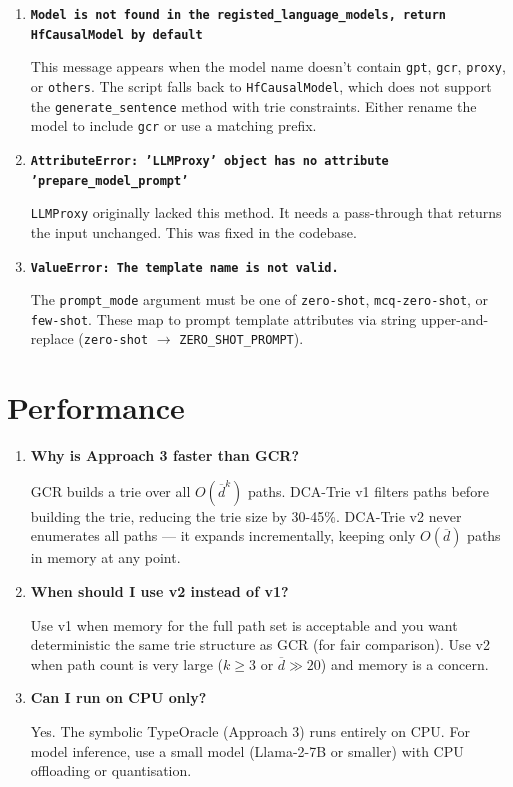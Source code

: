 \documentclass[11pt,a4paper,oneside,openany]{book}
\theoremstyle{definition}
\newcommand{\code}[1]{\texttt{#1}}
\begin{document}
\begin{enumerate}

	\item \textbf{\texttt{Model is not found in the registed\_language\_models, return HfCausalModel by default}}

	      This message appears when the model name doesn't contain \code{gpt}, \code{gcr}, \code{proxy}, or \code{others}. The script falls back to \code{HfCausalModel}, which does not support the \code{generate\_sentence} method with trie constraints. Either rename the model to include \code{gcr} or use a matching prefix.

	\item \textbf{\texttt{AttributeError: 'LLMProxy' object has no attribute 'prepare\_model\_prompt'}}

	      \code{LLMProxy} originally lacked this method. It needs a pass-through that returns the input unchanged. This was fixed in the codebase.

	\item \textbf{\texttt{ValueError: The template name is not valid.}}

	      The \code{prompt\_mode} argument must be one of \code{zero-shot}, \code{mcq-zero-shot}, or \code{few-shot}. These map to prompt template attributes via string upper-and-replace (\code{zero-shot} $\to$ \code{ZERO\_SHOT\_PROMPT}).

\end{enumerate}

\section{Performance}

\begin{enumerate}

	\item \textbf{Why is Approach 3 faster than GCR?}

	      GCR builds a trie over all $O(\overline{d}^k)$ paths. DCA-Trie v1 filters paths before building the trie, reducing the trie size by 30-45\%. DCA-Trie v2 never enumerates all paths --- it expands incrementally, keeping only $O(\overline{d})$ paths in memory at any point.

	\item \textbf{When should I use v2 instead of v1?}

	      Use v1 when memory for the full path set is acceptable and you want deterministic the same trie structure as GCR (for fair comparison). Use v2 when path count is very large ($k \ge 3$ or $\overline{d} \gg 20$) and memory is a concern.

	\item \textbf{Can I run on CPU only?}

	      Yes. The symbolic TypeOracle (Approach 3) runs entirely on CPU. For model inference, use a small model (Llama-2-7B or smaller) with CPU offloading or quantisation.

\end{enumerate}
\end{document}
